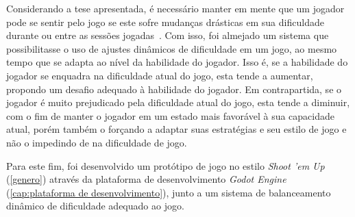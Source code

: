 Considerando a tese apresentada, é necessário manter em mente que um jogador pode se sentir \textquotedbl{} pelo jogo se este sofre mudanças drásticas em sua dificuldade durante ou entre as sessões jogadas~\citep{DynamicDiffAdjustment}. Com isso, foi almejado um sistema que possibilitasse o uso de ajustes dinâmicos de dificuldade em um jogo, ao mesmo tempo que se adapta ao nível da habilidade do jogador. Isso é, se a habilidade do jogador se enquadra na dificuldade atual do jogo, esta tende a aumentar, propondo um desafio adequado à habilidade do jogador. Em contrapartida, se o jogador é muito prejudicado pela dificuldade atual do jogo, esta tende a diminuir, com o fim de manter o jogador em um estado mais favorável à sua capacidade atual, porém também o forçando a adaptar suas estratégias e seu estilo de jogo e não o impedindo de \textquotedbl{} na dificuldade de jogo.

Para este fim, foi desenvolvido um protótipo de jogo no estilo \textit{Shoot 'em Up} (\ref{genero}) através da plataforma de desenvolvimento \textit{Godot Engine} (\ref{cap:plataforma de desenvolvimento}), junto a um sistema de balanceamento dinâmico de dificuldade adequado ao jogo.

